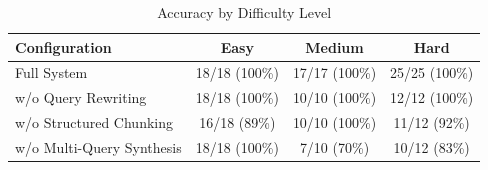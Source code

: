 \begin{table}[h]
\centering
\caption{Accuracy by Difficulty Level}
\label{tab:difficulty}
\begin{tabular}{lccc}
\toprule
\textbf{Configuration} & \textbf{Easy} & \textbf{Medium} & \textbf{Hard} \\
\midrule
Full System & 18/18 (100\%) & 17/17 (100\%) & 25/25 (100\%) \\
w/o Query Rewriting & 18/18 (100\%) & 10/10 (100\%) & 12/12 (100\%) \\
w/o Structured Chunking & 16/18 (89\%) & 10/10 (100\%) & 11/12 (92\%) \\
w/o Multi-Query Synthesis & 18/18 (100\%) & 7/10 (70\%) & 10/12 (83\%) \\
\bottomrule
\end{tabular}
\end{table}